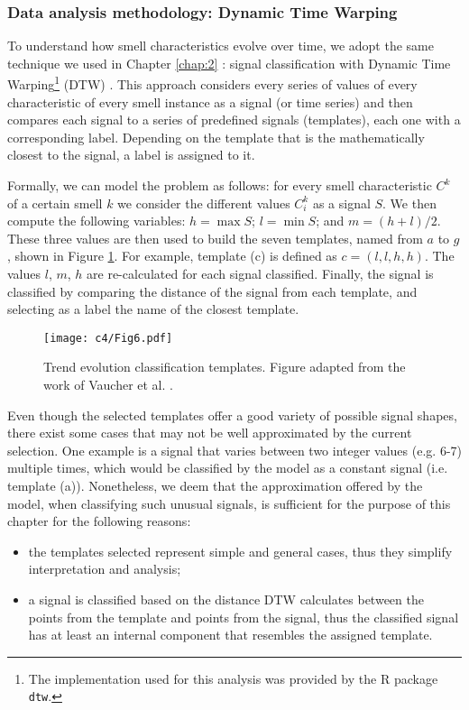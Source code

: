 \subsubsection{Data analysis methodology: Dynamic Time Warping}\label{c4:sec:methodology-rq1.1}
To understand how smell characteristics evolve over time, we adopt the same technique we used in Chapter \ref{chap:2} \cite{Vaucher2009}: signal classification with Dynamic Time Warping\footnote{The implementation used for this analysis was provided by the R package \texttt{dtw}.} (DTW) \cite{Kruskal1983}.
This approach considers every series of values of every characteristic of every smell instance as a signal (or time series) and then compares each signal to a series of predefined signals (templates), each one with a corresponding label. 
Depending on the template that is the mathematically closest to the signal, a label is assigned to it.

Formally, we can model the problem as follows: for every smell characteristic $C^{k}$ of a certain smell $k$ we consider the different values $C^{k}_i$ as a signal $S$. We then compute the following variables: $h = \max S$; $l = \min S$; and $m = (h+l)/2$.
These three values are then used to build the seven templates, named from $a$ to $g$, shown in Figure \ref{c4:fig:classification-templates}. For example, template (c) is defined as $c = (l, l, h, h)$.
The values $l$, $m$, $h$ are re-calculated for each signal classified.
Finally, the signal is classified by comparing the distance of the signal from each template, and selecting as a label the name of the closest template. 

\begin{figure}[h]
    \centering
    \texttt{[image: c4/Fig6.pdf]}
    \caption{Trend evolution classification templates. Figure adapted from the work of Vaucher et al. \cite{Vaucher2009}.}\label{c4:fig:classification-templates}
\end{figure}

Even though the selected templates offer a good variety of possible signal shapes, there exist some cases that may not be well approximated by the current selection.
One example is a signal that varies between two integer values (e.g. 6-7) multiple times, which would be classified by the model as a constant signal (i.e. template (a)).
Nonetheless, we deem that the approximation offered by the model, when classifying such unusual signals, is sufficient for the purpose of this chapter for the following reasons:
\begin{itemize}
    \item the templates selected represent simple and general cases, thus they simplify interpretation and analysis;
    \item a signal is classified based on the distance DTW calculates between the points from the template and points from the signal, thus the classified signal has at least an internal component that resembles the assigned template.
\end{itemize}

